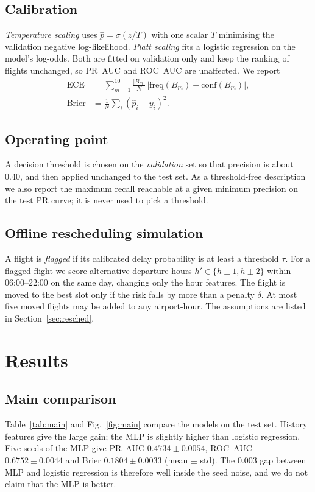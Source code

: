 \documentclass[conference]{IEEEtran}
\begin{document}
\subsection{Calibration}
\emph{Temperature scaling} \cite{guo} uses $\hat p=\sigma(z/T)$ with one scalar $T$ minimising the validation negative log-likelihood. \emph{Platt scaling} \cite{platt} fits a logistic regression on the model's log-odds. Both are fitted on validation only and keep the ranking of flights unchanged, so PR~AUC and ROC~AUC are unaffected. We report
\begin{align}
\mathrm{ECE}&=\sum_{m=1}^{10}\tfrac{|B_m|}{N}\,\big|\mathrm{freq}(B_m)-\mathrm{conf}(B_m)\big|,\\
\mathrm{Brier}&=\tfrac1N\sum_i(\hat p_i-y_i)^2 .
\end{align}

\subsection{Operating point}
A decision threshold is chosen on the \emph{validation} set so that precision is about 0.40, and then applied unchanged to the test set. As a threshold-free description we also report the maximum recall reachable at a given minimum precision on the test PR curve; it is never used to pick a threshold.

\subsection{Offline rescheduling simulation}
A flight is \emph{flagged} if its calibrated delay probability is at least a threshold $\tau$. For a flagged flight we score alternative departure hours $h'\in\{h\pm1,h\pm2\}$ within 06:00--22:00 on the same day, changing only the hour features. The flight is moved to the best slot only if the risk falls by more than a penalty $\delta$. At most five moved flights may be added to any airport-hour. The assumptions are listed in Section~\ref{sec:resched}.

\section{Results}
\subsection{Main comparison}
Table~\ref{tab:main} and Fig.~\ref{fig:main} compare the models on the test set. History features give the large gain; the MLP is slightly higher than logistic regression. Five seeds of the MLP give PR~AUC $0.4734\pm0.0054$, ROC~AUC $0.6752\pm0.0044$ and Brier $0.1804\pm0.0033$ (mean $\pm$ std). The 0.003 gap between MLP and logistic regression is therefore well inside the seed noise, and we do not claim that the MLP is better.
\end{document}
